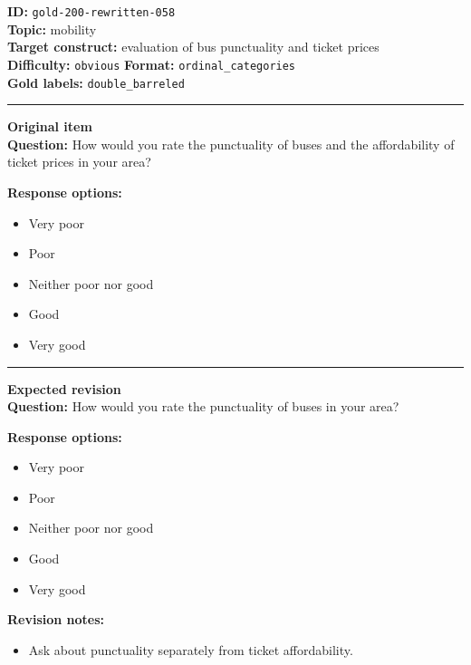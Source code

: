 \documentclass[10pt,a4paper]{article}
\newcommand{\sectionline}{\vspace{0.15em}\hrule\vspace{0.35em}}
\begin{document}
\begin{tcolorbox}[colframe=FlawRed,colback=white,colbacktitle=FlawRed!9,coltitle=black,title={Item 058\hfill Flawed item}]
\textbf{ID:} \texttt{gold-200-rewritten-058}\\
\textbf{Topic:} mobility\\
\textbf{Target construct:} evaluation of bus punctuality and ticket prices\\
\textbf{Difficulty:} \texttt{obvious} \quad \textbf{Format:} \texttt{ordinal\_categories}\\
\textbf{Gold labels:} \texttt{double\_barreled}\\
\sectionline
\textbf{Original item}\\
\textbf{Question:} How would you rate the punctuality of buses and the affordability of ticket prices in your area?
\par\textbf{Response options:}
\begin{itemize}
\item Very poor
\item Poor
\item Neither poor nor good
\item Good
\item Very good
\end{itemize}
\sectionline
\textbf{Expected revision}\\
\textbf{Question:} How would you rate the punctuality of buses in your area?
\par\textbf{Response options:}
\begin{itemize}
\item Very poor
\item Poor
\item Neither poor nor good
\item Good
\item Very good
\end{itemize}
\par\textbf{Revision notes:}
\begin{itemize}
\item Ask about punctuality separately from ticket affordability.
\end{itemize}
\end{tcolorbox}
\end{document}
